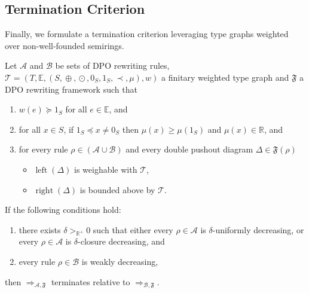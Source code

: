 \subsection{Termination Criterion}
\label{nwf:sec:proving_termination}
Finally, we formulate a termination criterion leveraging type graphs weighted over non-well-founded semirings. 
\begin{theorem} 
    \label{nwf:thm:termination_grs}
    Let $\mathcal{A}$ and $\mathcal{B}$ be sets of DPO rewriting rules, $\mathcal{T} \mathop{=} (T,\mathbb{E}, (S, \mathop{\oplus}, \mathop{\odot}, 0_S, 1_S, \prec, \mu), w)$ a finitary weighted type graph and $\mathfrak{F}$ a DPO rewriting framework such that

     \begin{enumerate}[label=\roman*)]
        \item\label{thm1:hyp3} $w(e) \mathop{\succeq} 1_S$ for all $e \mathop{\in} \mathbb{E}$, and
        \item\label{thm1:hyp4} for all $x \mathop{\in} S$, if $ 1_S \mathop{\preceq} x \mathop{\neq} 0_S$ then $\mu(x) \mathop{\geq} \mu(1_S)$ and $\mu(x) \mathop{\in} \mathbb{R}$, and
        \item for every rule $\rho \mathop{\in} (\mathcal{A }\mathop{\cup} \mathcal{B })$ and every double pushout diagram  
        $\Delta \mathop{\in} \mathfrak{F}(\rho)$ 
        \begin{itemize}
            \item \(\operatorname{left}(\Delta)\) is weighable with \(\mathcal{T}\),
            \item \(\operatorname{right}(\Delta)\) is bounded above by \(\mathcal{T}\). 
        \end{itemize}
    \end{enumerate}       

    \noindent If the following conditions hold:
    \begin{enumerate}
        \item there exists $\delta >_{\mathbb{R}^+} 0$ such that either every $\rho \mathop{\in} \mathcal{A}$ is $\delta$-uniformly decreasing, or every $\rho \mathop{\in} \mathcal{A}$ is $\delta$-closure decreasing, and
        \item every rule $\rho \mathop{\in} \mathcal{B}$ is weakly decreasing,
    \end{enumerate}
    then $\mathop{\Rightarrow}_{\mathcal{A},\mathfrak{F}}$ terminates relative to $\mathop{\Rightarrow}_{\mathcal{B},\mathfrak{F}}$.
\end{theorem} 
 
